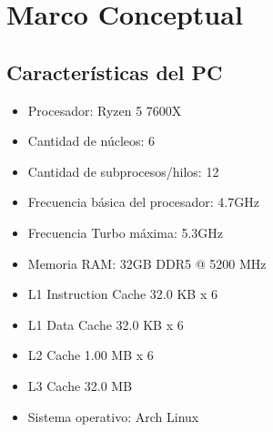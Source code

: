 
\section{Marco Conceptual}
\label{sec:Marco Conceptual}

\subsection{Características del PC}
\label{sec:Características del PC} 

\begin{itemize}
   \item Procesador: Ryzen 5 7600X
   \item Cantidad de núcleos: 6
   \item Cantidad de subprocesos/hilos: 12
   \item Frecuencia básica del procesador: 4.7GHz
   \item Frecuencia Turbo máxima: 5.3GHz
   \item Memoria RAM: 32GB DDR5 @ 5200 MHz
   \item L1 Instruction Cache          32.0 KB x 6
   \item L1 Data Cache                 32.0 KB x 6
   \item L2 Cache                      1.00 MB x 6
   \item L3 Cache                      32.0 MB
   \item Sistema operativo: Arch Linux
\end{itemize}

